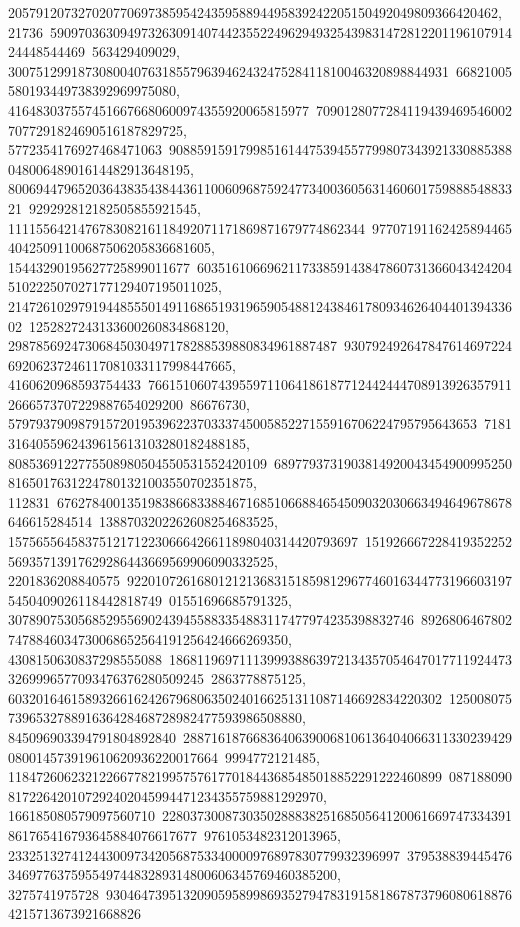 {{{2057912073270207706973859542435958894495839242205150492049809366420462, 21736\
59097036309497326309140744235522496294932543983147281220119610791424448544469\
563429409029, 300751299187308004076318557963946243247528411810046320898844931\
66821005580193449738392969975080, 4164830375574516676680600974355920065815977\
70901280772841194394695460027077291824690516187829725, 5772354176927468471063\
908859159179985161447539455779980734392133088538804800648901614482913648195, 
   80069447965203643835438443611006096875924773400360563146060175988854883321\
929292812182505855921545, 111155642147678308216118492071171869871679774862344\
9770719116242589446540425091100687506205836681605, 15443290195627725899011677\
603516106696211733859143847860731366043424204510222507027177129407195011025, 
   21472610297919448555014911686519319659054881243846178093462640440139433602\
1252827243133600260834868120, 29878569247306845030497178288539880834961887487\
93079249264784761469722469206237246117081033117998447665, 4160620968593754433\
76615106074395597110641861877124424447089139263579112666573707229887654029200\
86676730, 5797937909879157201953962237033374500585227155916706224795795643653\
71813164055962439615613103280182488185, 8085369122775508980504550531552420109\
689779373190381492004345490099525081650176312247801321003550702351875, 112831\
67627840013519838668338846716851066884654509032030663494649678678646615284514\
1388703202262608254683525, 15756556458375121712230666426611898040314420793697\
15192666722841935225256935713917629286443669569906090332525, 2201836208840575\
92201072616801212136831518598129677460163447731966031975450409026118442818749\
01551696685791325, 3078907530568529556902439455883354883117477974235398832746\
89268064678027478846034730068652564191256424666269350, 4308150630837298555088\
18681196971113999388639721343570546470177119244733269996577093476376280509245\
2863778875125, 60320164615893266162426796806350240166251311087146692834220302\
125008075739653278891636428468728982477593986508880, 845096903394791804892840\
28871618766836406390068106136404066311330239429080014573919610620936220017664\
9994772121485, 11847260623212266778219957576177018443685485018852291222460899\
087188090817226420107292402045994471234355759881292970, 166185080579097560710\
22803730087303502888382516850564120061669747334391861765416793645884076617677\
9761053482312013965, 23325132741244300973420568753340000976897830779932396997\
37953883944547634697763759554974483289314800606345769460385200, 3275741975728\
93046473951320905958998693527947831915818678737960806188764215713673921668826\
}}}
